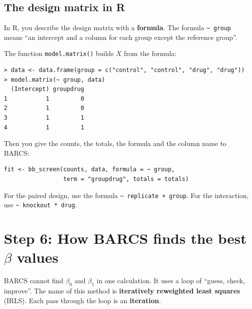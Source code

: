 \documentclass[12pt]{article}
\begin{document}
\subsection{The design matrix in R}

In R, you describe the design matrix with a \textbf{formula}. The formula
\texttt{\textasciitilde\ group} means ``an intercept and a column for each
group except the reference group''.

The function \texttt{model.matrix()} builds $X$ from the formula:

\begin{center}
\begin{minipage}{0.86\textwidth}
\small
\begin{verbatim}
> data <- data.frame(group = c("control", "control", "drug", "drug"))
> model.matrix(~ group, data)
  (Intercept) groupdrug
1           1         0
2           1         0
3           1         1
4           1         1
\end{verbatim}
\end{minipage}
\end{center}

Then you give the counts, the totals, the formula and the column name to
BARCS:

\begin{center}
\begin{minipage}{0.86\textwidth}
\small
\begin{verbatim}
fit <- bb_screen(counts, data, formula = ~ group,
                 term = "groupdrug", totals = totals)
\end{verbatim}
\end{minipage}
\end{center}

For the paired design, use the formula \texttt{\textasciitilde\ replicate +
group}. For the interaction, use \texttt{\textasciitilde\ knockout * drug}.

\section{Step 6: How BARCS finds the best \texorpdfstring{$\beta$}{beta} values}

BARCS cannot find $\beta_0$ and $\beta_1$ in one calculation. It uses a loop
of ``guess, check, improve''. The name of this method is
\textbf{iteratively reweighted least squares} (IRLS). Each pass through the
loop is an \textbf{iteration}.
\end{document}
